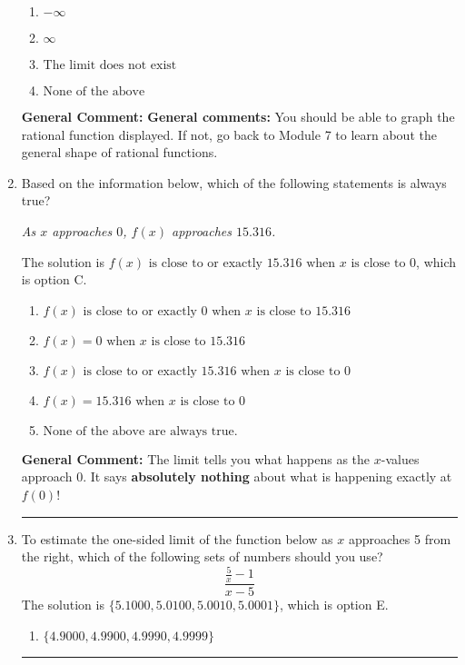 \documentclass{extbook}[14pt]
\newcommand{\litem}[1]{\item #1

\rule{\textwidth}{0.4pt}}
\begin{document}
\begin{enumerate}
{\begin{enumerate}[label=\Alph*.]
\item \( -\infty \)


\item \( \infty \)


\item \( \text{The limit does not exist} \)


\item \( \text{None of the above} \)


\end{enumerate}

\textbf{General Comment:} \textbf{General comments:} You should be able to graph the rational function displayed. If not, go back to Module 7 to learn about the general shape of rational functions.
}
\litem{
Based on the information below, which of the following statements is always true?

\begin{center}
    \textit{ As $x$ approaches $0$, $f(x)$ approaches $15.316$. }
\end{center}
The solution is \( f(x) \text{ is close to or exactly } 15.316 \text{ when } x \text{ is close to } 0 \), which is option C.\begin{enumerate}[label=\Alph*.]
\item \( f(x) \text{ is close to or exactly } 0 \text{ when } x \text{ is close to } 15.316 \)


\item \( f(x) = 0 \text{ when } x \text{ is close to } 15.316 \)


\item \( f(x) \text{ is close to or exactly } 15.316 \text{ when } x \text{ is close to } 0 \)


\item \( f(x) = 15.316 \text{ when } x \text{ is close to } 0 \)


\item \( \text{None of the above are always true.} \)


\end{enumerate}

\textbf{General Comment:} The limit tells you what happens as the $x$-values approach $0$. It says \textbf{absolutely nothing} about what is happening exactly at $f(0)$!
}
\litem{
To estimate the one-sided limit of the function below as $x$ approaches 5 from the right, which of the following sets of numbers should you use?
\[ \frac{\frac{5}{x} - 1}{x - 5} \]The solution is \( \{ 5.1000, 5.0100, 5.0010, 5.0001 \} \), which is option E.\begin{enumerate}[label=\Alph*.]
\item \( \{ 4.9000, 4.9900, 4.9990, 4.9999 \} \)


\end{enumerate}}
\end{enumerate}
\end{document}
